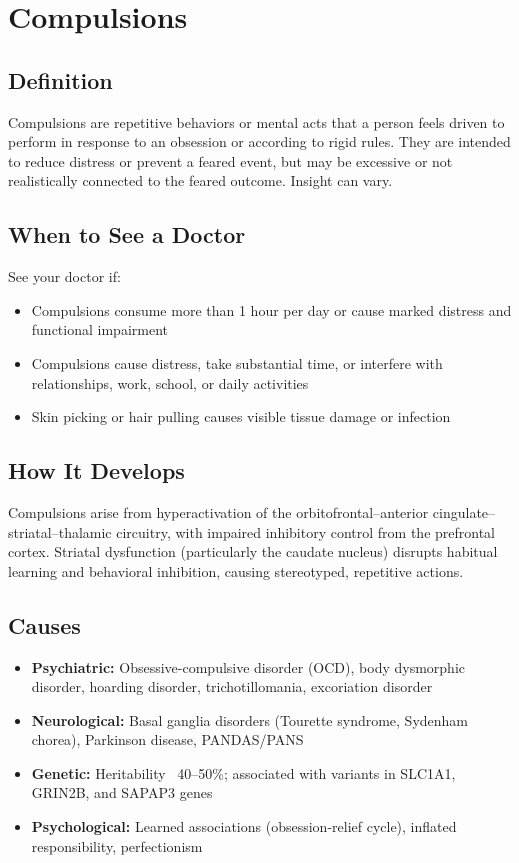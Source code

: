 \chapter{Compulsions}

\section*{Definition}
Compulsions are repetitive behaviors or mental acts that a person feels driven to perform in response to an obsession or according to rigid rules. They are intended to reduce distress or prevent a feared event, but may be excessive or not realistically connected to the feared outcome. Insight can vary.

\section*{When to See a Doctor}
See your doctor if:
\begin{itemize}
  \item Compulsions consume more than 1 hour per day or cause marked distress and functional impairment
  \item Compulsions cause distress, take substantial time, or interfere with relationships, work, school, or daily activities
  \item Skin picking or hair pulling causes visible tissue damage or infection
\end{itemize}

\section*{How It Develops}
Compulsions arise from hyperactivation of the orbitofrontal--anterior cingulate--striatal--thalamic circuitry, with impaired inhibitory control from the prefrontal cortex. Striatal dysfunction (particularly the caudate nucleus) disrupts habitual learning and behavioral inhibition, causing stereotyped, repetitive actions.

\section*{Causes}
\begin{itemize}
  \item \textbf{Psychiatric:} Obsessive-compulsive disorder (OCD), body dysmorphic disorder, hoarding disorder, trichotillomania, excoriation disorder
  \item \textbf{Neurological:} Basal ganglia disorders (Tourette syndrome, Sydenham chorea), Parkinson disease, PANDAS/PANS
  \item \textbf{Genetic:} Heritability ~40--50\%; associated with variants in SLC1A1, GRIN2B, and SAPAP3 genes
  \item \textbf{Psychological:} Learned associations (obsession-relief cycle), inflated responsibility, perfectionism
\end{itemize}

